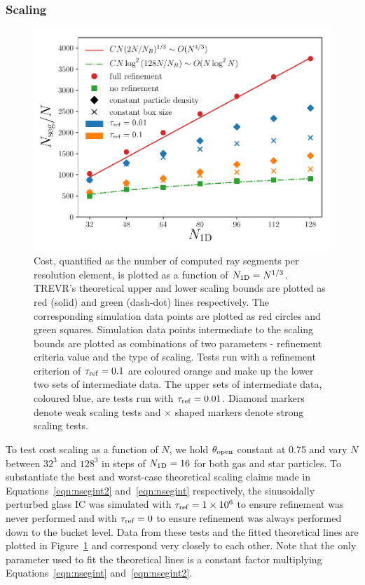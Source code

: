 \documentclass[fleq,usenatbib]{mnras}
\newcommand{\acro}{TREVR}
\providecommand{\e}[1]{\ensuremath{\times10^{#1}}}
\newcommand{\tr}{\tau_{\rm ref}}
\newcommand{\tO}{\theta_{\rm open}}
\begin{document}
{\subsubsection{Scaling}
\begin{figure}
\includegraphics[width=1\linewidth]{Figures/particle_scaling.pdf}
\caption{Cost, quantified as the number of computed ray segments per 
resolution element, is plotted as a function of $N_{\rm 1D} = N^{1/3}$. 
\acro{}'s theoretical upper and lower scaling bounds are plotted as red 
(solid) and green (dash-dot) lines respectively. The corresponding simulation 
data points are plotted as red circles and green squares. Simulation data 
points intermediate to the scaling bounds are plotted as combinations of two 
parameters - refinement criteria value and the type of scaling. Tests run 
with a refinement criterion of $\tr=0.1$ are coloured orange and make up the 
lower two sets of intermediate data. The upper sets of intermediate data, 
coloured blue, are tests run with $\tr=0.01$. Diamond markers denote weak 
scaling tests and $\times$ shaped markers denote strong scaling tests.}
\label{fig:pscale}
\end{figure}
To test cost scaling as a function of $N$, we hold $\tO$ constant at 0.75 and
vary $N$ between $32^3$ and $128^3$ in steps of $N_{\rm 1D} = 16$ for both gas 
and star particles. To substantiate the best and worst-case theoretical 
scaling claims made in Equations~\ref{eqn:nsegint2} and~\ref{eqn:nsegint} 
respectively, the sinusoidally perturbed glass IC was simulated with 
$\tr=1\e 6$ to ensure refinement was never performed and with $\tr=0$ to 
ensure refinement was always performed down to the bucket level. Data from 
these tests and the fitted theoretical lines are plotted in 
Figure~\ref{fig:pscale} and correspond very closely to each other. Note that 
the only parameter used to fit the theoretical lines is a constant factor 
multiplying Equations~\ref{eqn:nsegint} and~\ref{eqn:nsegint2}.

}
\end{document}
